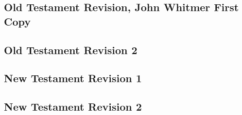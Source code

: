 \subsection{Old Testament Revision, John Whitmer First Copy}
	\label{JST-OTRJW}
	
	
	
\subsection{Old Testament Revision 2}
	\label{JST-OTR2}
	
	
	
\subsection{New Testament Revision 1}
	\label{JST-NTR1}
	
	
	
\subsection{New Testament Revision 2}
	\label{JST-NTR2}
	
	